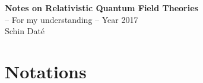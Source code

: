 \documentclass{jarticle}
\newcommand{\mainsrcdirectory}[0]{../../../src}
\newcounter{problem}
\begin{document}
\begin{titlepage} 
\vspace*{3cm}
\vspace*{2cm}
\noindent
\begin{center}
{\Huge \bf Notes on Relativistic Quantum Field Theories}   \\
-- For my understanding --
\vspace{1cm}
{\large Year 2017}
\vspace{1cm}
\\
{\Large 
Schin Dat\'e}
\end{center}
\end{titlepage} 

\setcounter{section}{-1}
\setcounter{page}{0}

\tableofcontents   

\setcounter{footnote}{0}
\setcounter{equation}{0}
\setcounter{figure}{0}
\setcounter{problem}{0}

\newpage %


\vspace*{-18mm}
\setcounter{section}{-1}
\setcounter{page}{1}
\section{Notations}

\end{document}
